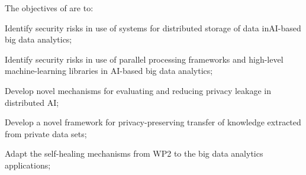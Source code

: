 \addtocounter{wpno}{1}
\begin{Workpackage}{\thewpno}
\WPTitle{\wpname{\thewpno}}

\begin{WPObjectives}
The objectives of \theWP{} are to:
\begin{compactitem}
\item Identify security risks in use of systems for distributed storage of data inAI-based big data analytics;
\item Identify security risks in use of parallel processing frameworks and high-level machine-learning libraries in AI-based big data analytics;
\item Develop novel mechanisms for evaluating and reducing privacy leakage in distributed AI;
\item Develop a novel framework for privacy-preserving transfer of knowledge extracted from private data sets;
\item Adapt the self-healing mechanisms from WP2 to the big data analytics applications;
\end{compactitem}
\end{WPObjectives}


\end{Workpackage}
